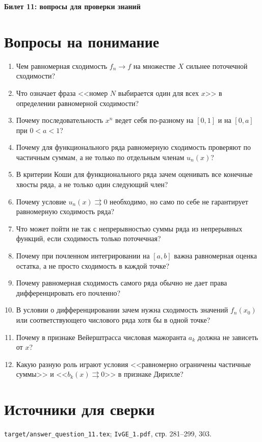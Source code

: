 \documentclass[12pt,a4paper]{article}
\begin{document}
\begin{center}
{\Large\bfseries Билет 11: вопросы для проверки знаний}
\end{center}

\noindent{}

\section*{Вопросы на понимание}

\begin{enumerate}
\item Чем равномерная сходимость \(f_n \to f\) на множестве \(X\) сильнее поточечной сходимости?
\item Что означает фраза <<номер \(N\) выбирается один для всех \(x\)>> в определении равномерной сходимости?
\item Почему последовательность \(x^n\) ведет себя по-разному на \([0,1]\) и на \([0,a]\) при \(0<a<1\)?
\item Почему для функционального ряда равномерную сходимость проверяют по частичным суммам, а не только по отдельным членам \(u_n(x)\)?
\item В критерии Коши для функционального ряда зачем оценивать все конечные хвосты ряда, а не только один следующий член?
\item Почему условие \(u_n(x)\rightrightarrows 0\) необходимо, но само по себе не гарантирует равномерную сходимость ряда?
\item Что может пойти не так с непрерывностью суммы ряда из непрерывных функций, если сходимость только поточечная?
\item Почему при почленном интегрировании на \([a,b]\) важна равномерная оценка остатка, а не просто сходимость в каждой точке?
\item Почему равномерная сходимость самого ряда обычно не дает права дифференцировать его почленно?
\item В условии о дифференцировании зачем нужна сходимость значений \(f_n(x_0)\) или соответствующего числового ряда хотя бы в одной точке?
\item Почему в признаке Вейерштрасса числовая мажоранта \(a_k\) должна не зависеть от \(x\)?
\item Какую разную роль играют условия <<равномерно ограничены частичные суммы>> и <<\(b_k(x)\rightrightarrows 0\)>> в признаке Дирихле?
\end{enumerate}

\section*{Источники для сверки}

\texttt{target/answer\_question\_11.tex};
\texttt{IvGE\_1.pdf}, стр. 281--299, 303.
\end{document}
